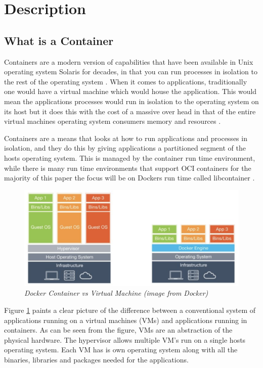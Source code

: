 \section{Description}
\label{sub:description}

\subsection{What is a Container}
\label{sub:container}
Containers are a modern version of capabilities that have been available in Unix operating system Solaris for decades, in that you can run processes in isolation to the rest of the operating system \citep{oracle_solaris}. When it comes to applications, traditionally one would have a virtual machine which would house the application. This would mean the applications processes would run in isolation to the operating system on its host but it does this with the cost of a massive over head in that of the entire virtual machines operating system consumers memory and resources \citep{yegulalp_2018}.

Containers are a means that looks at how to run applications and processes in isolation, and they do this by giving applications a partitioned segment of the hosts operating system. This is managed by the container run time environment, while there is many run time environments that support OCI containers for the majority of this paper the focus will be on Dockers run time called libcontainer \citep{docker_2018}.

\begin{figure}[!ht]
\centering
\includegraphics*[width=\textwidth]{images/docker-view.png}
\caption{\em Docker Container vs Virtual Machine (image from Docker)}
\label{img:docker_vm}
\end{figure}

Figure \ref{img:docker_vm} paints a clear picture of the difference between a conventional system of applications running on a virtual machines (VMs) and applications running in containers. As can be seen from the figure, VMs are an abstraction of the physical hardware. The hypervisor allows multiple VM's run on a single hosts operating system. Each VM has is own operating system along with all the binaries, libraries and packages needed for the applications. 

